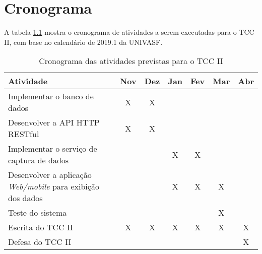 \chapter{Cronograma}

A tabela \ref{tab:cronograma} mostra o cronograma de atividades a serem executadas para o TCC II, com base no calendário de 2019.1 da UNIVASF.

\begin{table}[!thb]
   \centering
   \caption{\label{tab:cronograma} Cronograma das atividades previstas para o TCC II}
   \begin{adjustbox}{max width=\textwidth}
   \begin{tabular}{p{6.5cm}|c|c|c|c|c|c}
   \toprule
   \textbf{Atividade}                      & Nov & Dez & Jan & Fev & Mar & Abr \\ \hline
   Implementar o banco de dados              & X    & X     &       &        &          &          \\ \hline
   Desenvolver a API HTTP RESTful                      &   X   & X     &       &        &          &          \\ \hline
   Implementar o serviço de captura de dados        &      &      & X     &   X     &          &          \\ \hline
   Desenvolver a aplicação \textit{Web/mobile} para exibição dos dados         &      &      & X     &   X     &     X     &          \\ \hline
   Teste do sistema            &      &       &       &        & X        &          \\ \hline
   Escrita do TCC II                       &   X   & X     & X     & X      & X        & X        \\ \hline
  Defesa do TCC II                        &      &       &       &        &          & X       \\
   \bottomrule
   \end{tabular}
   \end{adjustbox}
\end{table}